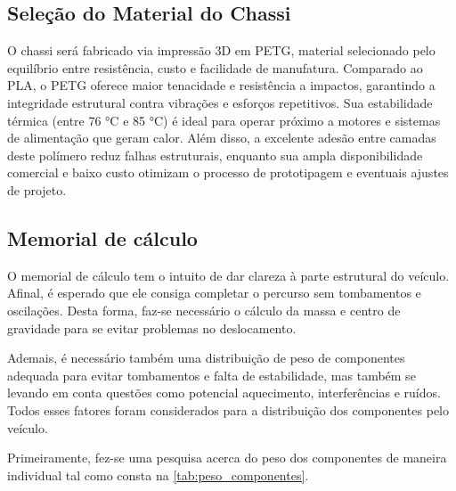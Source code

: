 \subsection{Seleção do Material do Chassi}

O chassi será fabricado via impressão 3D em PETG, material selecionado pelo equilíbrio entre resistência, custo e facilidade de manufatura. Comparado ao PLA, o PETG oferece maior tenacidade e resistência a impactos, garantindo a integridade estrutural contra vibrações e esforços repetitivos. Sua estabilidade térmica (entre 76 °C e 85 °C) é ideal para operar próximo a motores e sistemas de alimentação que geram calor. Além disso, a excelente adesão entre camadas deste polímero reduz falhas estruturais, enquanto sua ampla disponibilidade comercial e baixo custo otimizam o processo de prototipagem e eventuais ajustes de projeto. 
\subsection{Memorial de cálculo}

O memorial de cálculo tem o intuito de dar clareza à parte estrutural do veículo. Afinal, é esperado que ele consiga completar o percurso sem tombamentos e oscilações. Desta forma, faz-se necessário o cálculo da massa e centro de gravidade para se evitar problemas no deslocamento. 

Ademais, é necessário também uma distribuição de peso de componentes adequada para evitar tombamentos e falta de estabilidade, mas também se levando em conta questões como potencial aquecimento, interferências e ruídos. Todos esses fatores foram considerados para a distribuição dos componentes pelo veículo. 

Primeiramente, fez-se uma pesquisa acerca do peso dos componentes de maneira individual tal como consta na \ref{tab:peso_componentes}. 

